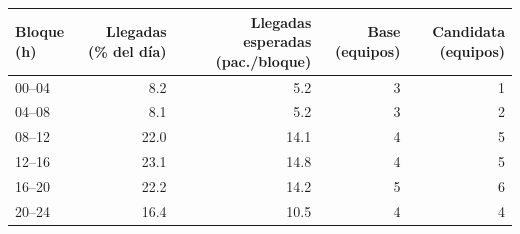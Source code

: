 \begin{tabular}{lrrrr}
\toprule
Bloque (h) & Llegadas (\% del día) & Llegadas esperadas (pac./bloque) & Base (equipos) & Candidata (equipos) \\
\midrule
00--04 & 8.2 & 5.2 & 3 & 1 \\
04--08 & 8.1 & 5.2 & 3 & 2 \\
08--12 & 22.0 & 14.1 & 4 & 5 \\
12--16 & 23.1 & 14.8 & 4 & 5 \\
16--20 & 22.2 & 14.2 & 5 & 6 \\
20--24 & 16.4 & 10.5 & 4 & 4 \\
\bottomrule
\end{tabular}
